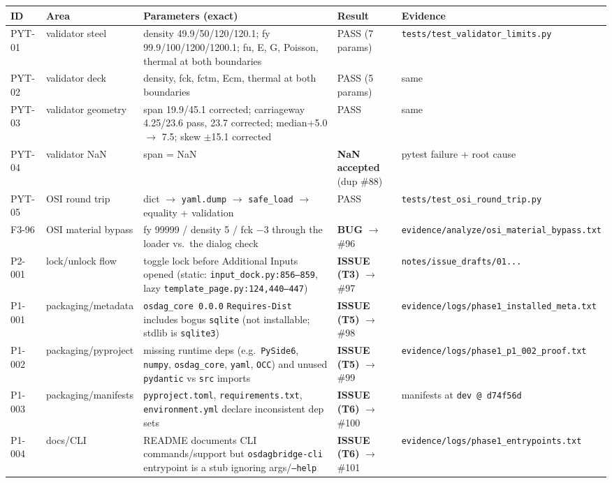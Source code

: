 \begin{longtable}{@{}p{1.4cm}p{3.0cm}p{6.2cm}p{2.6cm}p{2.0cm}@{}}
\toprule
ID & Area & Parameters (exact) & Result & Evidence \\
\midrule
PYT-01 & validator steel & density 49.9/50/120/120.1; fy 99.9/100/1200/1200.1; fu, E, G, Poisson, thermal at both boundaries & PASS (7 params) & \texttt{tests/test\_validator\_limits.py} \\
PYT-02 & validator deck & density, fck, fctm, Ecm, thermal at both boundaries & PASS (5 params) & same \\
PYT-03 & validator geometry & span 19.9/45.1 corrected; carriageway 4.25/23.6 pass, 23.7 corrected; median+5.0 $\rightarrow$ 7.5; skew $\pm$15.1 corrected & PASS & same \\
PYT-04 & validator NaN & span = NaN & \textbf{NaN accepted} (dup \#88) & pytest failure + root cause \\
PYT-05 & OSI round trip & dict $\rightarrow$ \texttt{yaml.dump} $\rightarrow$ \texttt{safe\_load} $\rightarrow$ equality + validation & PASS & \texttt{tests/test\_osi\_round\_trip.py} \\
F3-96 & OSI material bypass & fy 99999 / density 5 / fck $-$3 through the loader vs.\ the dialog check & \textbf{BUG} $\rightarrow$ \#96 & \texttt{evidence/analyze/osi\_material\_bypass.txt} \\
P2-001 & lock/unlock flow & toggle lock before Additional Inputs opened (static: \texttt{input\_dock.py:856--859}, lazy \texttt{template\_page.py:124,440--447}) & \textbf{ISSUE (T3)} $\rightarrow$ \#97 & \texttt{notes/issue\_drafts/01...} \\
P1-001 & packaging/metadata & \texttt{osdag\_core 0.0.0} \texttt{Requires-Dist} includes bogus \texttt{sqlite} (not installable; stdlib is \texttt{sqlite3}) & \textbf{ISSUE (T5)} $\rightarrow$ \#98 & \texttt{evidence/logs/phase1\_installed\_meta.txt} \\
P1-002 & packaging/pyproject & missing runtime deps (e.g.\ \texttt{PySide6}, \texttt{numpy}, \texttt{osdag\_core}, \texttt{yaml}, \texttt{OCC}) and unused \texttt{pydantic} vs \texttt{src} imports & \textbf{ISSUE (T5)} $\rightarrow$ \#99 & \texttt{evidence/logs/phase1\_p1\_002\_proof.txt} \\
P1-003 & packaging/manifests & \texttt{pyproject.toml}, \texttt{requirements.txt}, \texttt{environment.yml} declare inconsistent dep sets & \textbf{ISSUE (T6)} $\rightarrow$ \#100 & manifests at \texttt{dev @ d74f56d} \\
P1-004 & docs/CLI & README documents CLI commands/support but \texttt{osdagbridge-cli} entrypoint is a stub ignoring args/\texttt{--help} & \textbf{ISSUE (T6)} $\rightarrow$ \#101 & \texttt{evidence/logs/phase1\_entrypoints.txt} \\

\end{longtable}
